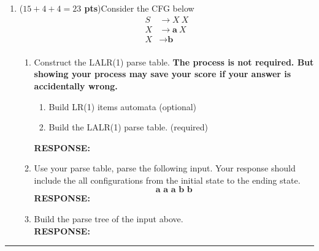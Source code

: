 \documentclass[10pt]{article}
\newcommand {\pts}[1]{({\bf #1 pts})}
\newcommand {\response}{{\color{blue}\textbf{RESPONSE:}\\}}
\begin{document}
\begin{enumerate}
\begin{enumerate}
	          \item To construct at SLR(1) parser, Compute FIRST function and FOLLOW function of each Non-terminals. \\\response
	          \item Construct the SLR items automaton. The process is not required. \\\response
	          \item Based on the SLR items automaton, construct the parsing table. The process is not required. Please refer to the format in the lectures or in the preface \ref{fig:table}. \\\response
	          \item Based on your parse table, parse this input sequence to a parse tree. 
	          $$
	          \textbf{if ID : NEWLINE INDENT ID DEDENT}
	          $$\\\response
	      \end{enumerate} 
	      \newpage
	      \item \pts{$15+4+4 = 23$}Consider the CFG below
	      $$
	      \begin{aligned}
S &\to X\ X\\
X &\to \textbf{a}\ X\\ 
X &\to \textbf{b}     \\
	      \end{aligned}    
	      $$
	      \begin{enumerate}
	   \item Construct the LALR(1) parse table. \textbf{The process is not required. But showing your process may save your score if your answer is accidentally wrong.}
	   \begin{enumerate}
	       \item Build LR(1) items automata (optional)
	       \item Build the LALR(1) parse table. (required)
	   \end{enumerate}\response
	      \item Use your parse table, parse the following input. Your response should include the all configurations from the initial state to the ending state.
	      $$
	      \textbf{a a a b b}
	      $$\response
	      \item Build the parse tree of the input above. \\\response
	      \end{enumerate}
\end{enumerate}
\vfill
\hrule
{}
\end{document}
